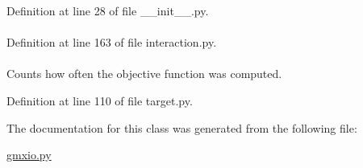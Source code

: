 \-Definition at line 28 of file \-\_\-\-\_\-init\-\_\-\-\_\-.\-py.

\hypertarget{classforcebalance_1_1interaction_1_1Interaction_a44f014dd322e410a37dd453f99d879ba}{
\paragraph[{weight}]{}}\label{classforcebalance_1_1interaction_1_1Interaction_a44f014dd322e410a37dd453f99d879ba}


\-Definition at line 163 of file interaction.\-py.

\hypertarget{classforcebalance_1_1target_1_1Target_ad4cd0ab38d8fc97d3e7a6e22ce130a16}{
\paragraph[{xct}]{}}\label{classforcebalance_1_1target_1_1Target_ad4cd0ab38d8fc97d3e7a6e22ce130a16}


\-Counts how often the objective function was computed. 



\-Definition at line 110 of file target.\-py.



\-The documentation for this class was generated from the following file\-:\begin{DoxyCompactItemize}
\item 
\hyperlink{gmxio_8py}{gmxio.\-py}\end{DoxyCompactItemize}
